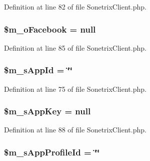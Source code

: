 Definition at line 82 of file SonetrixClient.php.

\hypertarget{classSonetrixClient_a664f01f92cfc167d1219ec19e9451dbb}{
\subsubsection[{\$m\_\-oFacebook}]{\setlength{\rightskip}{0pt plus 5cm}\$m\_\-oFacebook = null}}
\label{classSonetrixClient_a664f01f92cfc167d1219ec19e9451dbb}


Definition at line 85 of file SonetrixClient.php.

\hypertarget{classSonetrixClient_acd79de47be3cc9eb08fa4190b5d8a8bb}{
\subsubsection[{\$m\_\-sAppId}]{\setlength{\rightskip}{0pt plus 5cm}\$m\_\-sAppId = \char`\"{}\char`\"{}}}
\label{classSonetrixClient_acd79de47be3cc9eb08fa4190b5d8a8bb}


Definition at line 75 of file SonetrixClient.php.

\hypertarget{classSonetrixClient_aeba89a380900e90bdfe18c08bf057a13}{
\subsubsection[{\$m\_\-sAppKey}]{\setlength{\rightskip}{0pt plus 5cm}\$m\_\-sAppKey = null}}
\label{classSonetrixClient_aeba89a380900e90bdfe18c08bf057a13}


Definition at line 88 of file SonetrixClient.php.

\hypertarget{classSonetrixClient_a24e788d955d13e6906581754ac15bd6b}{
\subsubsection[{\$m\_\-sAppProfileId}]{\setlength{\rightskip}{0pt plus 5cm}\$m\_\-sAppProfileId = \char`\"{}\char`\"{}}}
\label{classSonetrixClient_a24e788d955d13e6906581754ac15bd6b}


